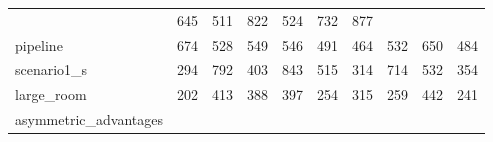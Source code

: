 \begin{table}[t]
\begin{center}
\begin{tabular}{llllllllll}
           & 645
        
           & 511
        
           & 822
        
           & 524
        
           & 732
        
           & 877
         \\

        pipeline
        
           & 674
        
           & 528
        
           & 549
        
           & 546
        
           & 491
        
           & 464
        
           & 532
        
           & 650
        
           & 484
         \\

        scenario1\_s
        
           & 294
        
           & 792
        
           & 403
        
           & 843
        
           & 515
        
           & 314
        
           & 714
        
           & 532
        
           & 354
         \\

        large\_room
        
           & 202
        
           & 413
        
           & 388
        
           & 397
        
           & 254
        
           & 315
        
           & 259
        
           & 442
        
           & 241
         \\

        asymmetric\_advantages
        

\end{tabular}
\end{center}
\end{table}
